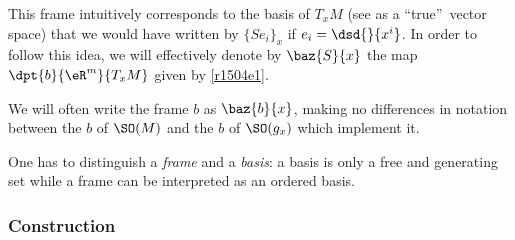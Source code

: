 This frame intuitively corresponds to the basis of $T_xM$ (see as a ``true''\ vector space) that we would have written by $\{Se_i\}_x$ if $e_i=\dsd{}{x^i}$. In order to follow this idea, we will effectively denote by $\baz{S}{x}$ the map $\dpt{b}{\eR^m}{T_xM}$ given by \eqref{r1504e1}.

We will often write the frame $b$ as $\baz{b}{x}$, making no differences in notation between the $b$ of $\SO(M)$ and the $b$ of $\SO(g_x)$ which implement it.

\begin{remark}
	One has to distinguish a \emph{frame} and a \emph{basis}: a basis is only a free and generating set while a frame can be interpreted as an ordered basis.
\end{remark}


\subsubsection{Construction}

